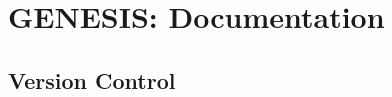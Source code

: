 \documentclass[12pt]{article}
\begin{document}
\section*{GENESIS: Documentation}

\subsection*{Version Control}
\end{document}
